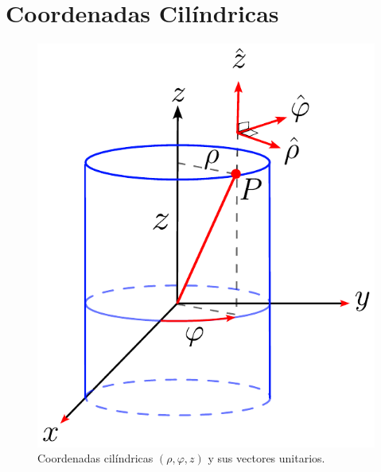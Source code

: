 \section{Coordenadas Cilíndricas}
\begin{figure}[H]
    \centering
    \includegraphics[scale = 0.6]{fig/Coordenadas-Cilindricas.pdf}
    \caption{Coordenadas cilíndricas $(\rho,\varphi, z)$ y sus vectores unitarios.}
    \label{fig:Coordenadas-Cilindricas}
\end{figure}


